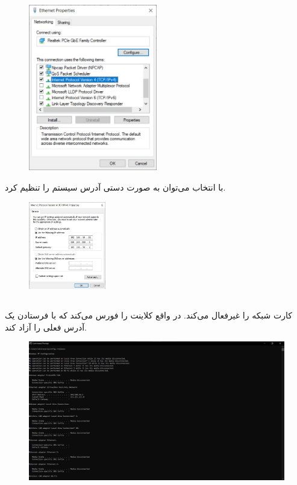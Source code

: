 \documentclass{article}
\begin{document}
\begin{figure}[H]
    \centering
    \includegraphics[width=0.5\textwidth]{figures/3.4.3.jpg}
    \caption
	{
	}
    \label{fig:fig1}
\end{figure}
با انتخاب  می‌توان به صورت دستی آدرس سیستم را تنظیم کرد.
\begin{figure}[H]
    \centering
    \includegraphics[width=0.3\textwidth]{figures/3.4.4.jpg}
    \caption
	{
	}
    \label{fig:fig1}
\end{figure}


\subsection{}
 کارت شبکه را غیرفعال می‌کند. در واقع کلاینت را فورس می‌کند که با فرستادن یک  آدرس  فعلی را آزاد کند.
\begin{figure}[H]
    \centering
    \includegraphics[width=1.0\textwidth]{figures/3.5.1.jpg}
    \caption
	{
	}
    \label{fig:fig1}
\end{figure}
\end{document}
